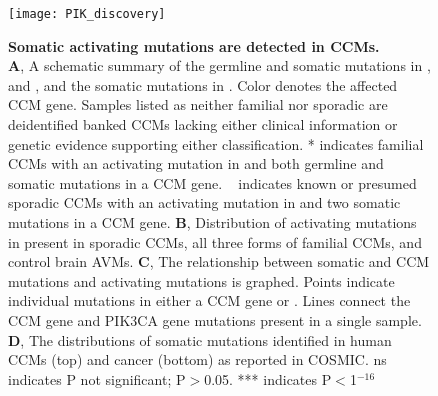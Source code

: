 \begin{figure}[tbp!]
\begin{center}
\texttt{[image: PIK\_discovery]}
\end{center}
\caption[Familial and Sporadic CCM Harbor Somatic Mutations in .] {\textbf{Somatic activating  mutations are detected in CCMs.} \\ \textbf{A},  A schematic summary of the germline and somatic mutations in ,  and , and the somatic mutations in . Color denotes the affected CCM gene. Samples listed as neither familial nor sporadic are deidentified banked CCMs lacking either clinical information or genetic evidence supporting either classification. * indicates familial CCMs with an activating mutation in  and both germline and somatic mutations in a CCM gene. \ddag  ~ indicates known or presumed sporadic CCMs with an activating mutation in  and two somatic mutations in a CCM gene. \textbf{B}, Distribution of activating mutations in  present in sporadic CCMs, all three forms of familial CCMs, and control brain AVMs.  \textbf{C}, The relationship between somatic  and CCM mutations and  activating mutations is graphed. Points indicate individual mutations in either a CCM gene or . Lines connect the CCM gene and PIK3CA gene mutations present in a single sample. \textbf{D}, The distributions of somatic  mutations identified in human CCMs (top) and cancer (bottom) as reported in COSMIC. ns indicates P not significant; P$>$0.05. *** indicates P$<$1$^{-16}$}

\label{PIK_discovery}
\end{figure}

